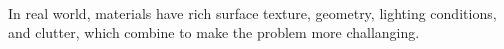 \paragraph*{}
In real world, materials have rich surface texture, geometry, lighting conditions, and clutter, which combine to make the problem more challanging.